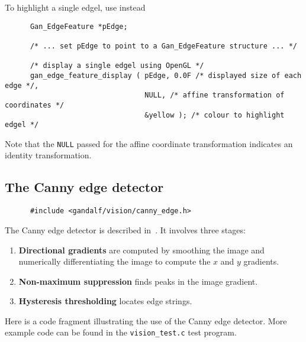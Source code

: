 To highlight a single edgel, use instead
\begin{verbatim}
      Gan_EdgeFeature *pEdge;

      /* ... set pEdge to point to a Gan_EdgeFeature structure ... */

      /* display a single edgel using OpenGL */
      gan_edge_feature_display ( pEdge, 0.0F /* displayed size of each edge */,
                                 NULL, /* affine transformation of coordinates */
                                 &yellow ); /* colour to highlight edgel */
\end{verbatim}
Note that the {\tt NULL} passed for the affine coordinate transformation
indicates an identity transformation.

\subsection{The Canny edge detector}
\begin{verbatim}
      #include <gandalf/vision/canny_edge.h>
\end{verbatim}
The Canny edge detector is described in~\cite{Canny:PAMI86}.
It involves three stages:
\begin{enumerate}
  \item {\bf Directional gradients} are computed by smoothing the image and
	numerically differentiating the image to compute the $x$ and $y$
	gradients.
  \item {\bf Non-maximum suppression} finds peaks in the image gradient.
  \item {\bf Hysteresis thresholding} locates edge strings.
\end{enumerate}
Here is a code fragment illustrating the use of the Canny edge detector.
More example code can be found in the {\tt vision\_test.c} test program.
